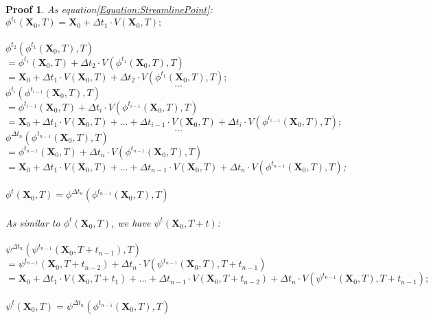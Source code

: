 \documentclass[
     11pt,         %
     a4paper,      %
     oneside,
     ]{article}
\newtheorem{myProof}{Proof}
\newcommand{\vect}[1]{\boldsymbol{#1}}
\begin{document}
	\begin{myProof}
		As equation\ref{Equation:StreamlinePoint}:\\
		$\phi^{t_{1}}(\vect{X}_{0},T)=\vect{X}_{0}+\Delta t_{1}\cdot V(\vect{X}_{0},T);$\\
		\\
		$\phi^{t_{2}}(\phi^{t_{1}}(\vect{X}_{0},T),T)$\\
		$=\phi^{t_{1}}(\vect{X}_{0},T)+\Delta t_{2}\cdot V(\phi^{t_{1}}(\vect{X}_{0},T),T)$\\
		$=\vect{X}_{0}+\Delta t_{1}\cdot V(\vect{X}_{0},T)+\Delta t_{2}\cdot V(\phi^{ t_{1}}(\vect{X}_{0},T),T);$\\
		$$...$$
		$\phi^{ t_{i}}(\phi^{ t_{i-1}}(\vect{X}_{0},T),T)$\\
		$=\phi^{ t_{i-1}}(\vect{X}_{0},T)+\Delta t_{i}\cdot V(\phi^{ t_{i-1}}(\vect{X}_{0},T),T)$\\
		$=\vect{X}_{0}+\Delta t_{1}\cdot V(\vect{X}_{0},T)+...+\Delta t_{i-1}\cdot V(\vect{X}_{0},T)+\Delta t_{i}\cdot V(\phi^{ t_{i-1}}(\vect{X}_{0},T),T);$\\
		$$...$$
		$\phi^{\Delta t_{n}}(\phi^{ t_{n-1}}(\vect{X}_{0},T),T)$\\
		$=\phi^{ t_{n-1}}(\vect{X}_{0},T)+\Delta t_{n}\cdot V(\phi^{ t_{n-1}}(\vect{X}_{0},T),T)$\\
		$=\vect{X}_{0}+\Delta t_{1}\cdot V(\vect{X}_{0},T)+...+\Delta t_{n-1}\cdot V(\vect{X}_{0},T)+\Delta t_{n}\cdot V(\phi^{t_{n-1}}(\vect{X}_{0},T),T)$;\\
		\\
		$\phi^{t}(\vect{X}_{0},T)=\phi^{\Delta t_{n}}(\phi^{t_{n-1}}(\vect{X}_{0},T),T)$\\
		\\
		As similar to $\phi^{t}(\vect{X}_{0},T)$, we have $\psi^{t}(\vect{X}_{0},T+t)$:\\
		\\
		$\psi^{\Delta t_{n}}(\psi^{t_{n-1}}(\vect{X}_{0},T+t_{n-1}),T)$\\
		$=\psi^{ t_{n-1}}(\vect{X}_{0},T+t_{n-2})+\Delta t_{n}\cdot V(\psi^{t_{n-1}}(\vect{X}_{0},T),T+t_{n-1})$\\
		$=\vect{X}_{0}+\Delta t_{1}\cdot V(\vect{X}_{0},T+t_{1})+...+\Delta t_{n-1}\cdot V(\vect{X}_{0},T+t_{n-2})+\Delta t_{n}\cdot V(\psi^{ t_{n-1}}(\vect{X}_{0},T),T+t_{n-1});$\\
		\\
		$\psi^{t}(\vect{X}_{0},T)=\psi^{\Delta t_{n}}(\phi^{t_{n-1}}(\vect{X}_{0},T),T)$\\
		\\

\end{myProof}
\end{document}
